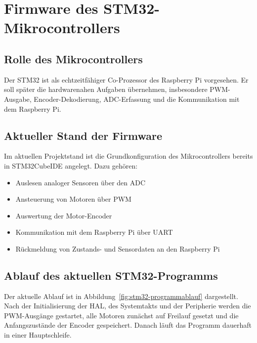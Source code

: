 \section{Firmware des STM32-Mikrocontrollers}
\subsection{Rolle des Mikrocontrollers}
Der STM32 ist als echtzeitfähiger Co-Prozessor des Raspberry Pi vorgesehen. Er soll später die hardwarenahen Aufgaben übernehmen, insbesondere PWM-Ausgabe, Encoder-Dekodierung, ADC-Erfassung und die Kommunikation mit dem Raspberry Pi.

\subsection{Aktueller Stand der Firmware}
Im aktuellen Projektstand ist die Grundkonfiguration des Mikrocontrollers bereits in STM32CubeIDE angelegt. Dazu gehören:

\begin{itemize}
	\item Auslesen analoger Sensoren über den ADC
	\item Ansteuerung von Motoren über PWM
	\item Auswertung der Motor-Encoder
	\item Kommunikation mit dem Raspberry Pi über UART
	\item Rückmeldung von Zustands- und Sensordaten an den Raspberry Pi
\end{itemize}

\subsection{Ablauf des aktuellen STM32-Programms}
Der aktuelle Ablauf ist in Abbildung~\ref{fig:stm32-programmablauf} dargestellt. Nach der Initialisierung der HAL, des Systemtakts und der Peripherie werden die PWM-Ausgänge gestartet, alle Motoren zunächst auf Freilauf gesetzt und die Anfangszustände der Encoder gespeichert. Danach läuft das Programm dauerhaft in einer Hauptschleife.

